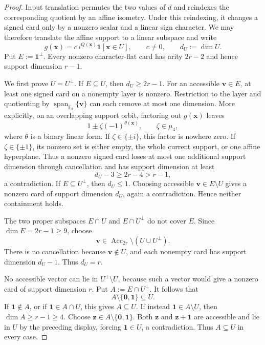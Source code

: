 \documentclass[11pt,letterpaper,onecolumn]{article}
\theoremstyle{plain}
\theoremstyle{definition}
\theoremstyle{remark}
\newcommand{\Ftwo}{\mathbb F_2}
\newcommand{\Span}{\operatorname{span}}
\newcommand{\one}{\mathbf 1}
\newcommand{\zero}{\mathbf 0}
\begin{document}
\begin{proof}
Input translation permutes the two values of \(d\) and reindexes the
corresponding quotient by an affine isometry.  Under this reindexing, it
changes a signed card only by a nonzero scalar and a linear sign character.
We may therefore
translate the affine support to a linear subspace and write
\hypertarget{eq:v4-recognition-normal-form}{}
\begin{equation*}
 g({\mathbf{x}})=c\,i^{Q({\mathbf{x}})}\one[{\mathbf{x}}\in U],
 \qquad c\ne0,
 \qquad d_U:=\dim U.
\end{equation*}
Put \(E:=\one^\perp\).  Every nonzero character-flat card has arity
\(2r-2\) and hence support dimension \(r-1\).

We first prove \(U=U^\perp\).  If \(E\subseteq U\), then
\(d_U\ge2r-1\).  For an accessible \({\mathbf{v}}\in E\), at least one signed card on
a nonempty layer is nonzero.  Restriction to the layer and quotienting by
\(\Span_{\Ftwo}\{{\mathbf{v}}\}\) can each remove at most one dimension.  More
explicitly, on an overlapping support orbit, factoring out \(g({\mathbf{x}})\) leaves
\[
 1\pm\zeta(-1)^{\theta({\mathbf{x}})},
 \qquad \zeta\in\mu_4,
\]
where \(\theta\) is a binary linear form.  If
\(\zeta\in\{\pm i\}\), this factor is nowhere zero.  If
\(\zeta\in\{\pm1\}\), its nonzero set is either empty, the whole current
support, or one affine hyperplane.  Thus a nonzero signed card loses at
most one additional support dimension through cancellation and has support
dimension at least
\[
 d_U-3\ge2r-4>r-1,
\]
a contradiction.  If \(E\subseteq U^\perp\), then \(d_U\le1\). Choosing
accessible \({\mathbf{v}}\in E\setminus U\) gives a nonzero card of support dimension
\(d_U\), again a contradiction.  Hence neither containment holds.

The two proper subspaces \(E\cap U\) and \(E\cap U^\perp\) do not cover
\(E\).  Since \(\dim E=2r-1\ge9\), choose
\[
 {\mathbf{v}}\in\operatorname{Acc}_{2r}\setminus(U\cup U^\perp).
\]
There is no cancellation because \({\mathbf{v}}\notin U\), and each nonempty card has
support dimension \(d_U-1\).  Thus \(d_U=r\).

No accessible vector can lie in \(U^\perp\setminus U\), because such a
vector would give a nonzero card of support dimension \(r\).  Put
\(A:=E\cap U^\perp\).  It follows that
\hypertarget{eq:v4-A-contained}{}
\begin{equation*}
 A\setminus\{\zero,\one\}\subseteq U.
\end{equation*}
If \(\one\notin A\), or if \(\one\in A\cap U\), this gives
\(A\subseteq U\).  If instead \(\one\in A\setminus U\), then
\(\dim A\ge r-1\ge4\). Choose \({\mathbf{z}}\in A\setminus\{\zero,\one\}\).  Both
\({\mathbf{z}}\) and \({\mathbf{z}}+\one\) are accessible and lie in \(U\) by the preceding
display, forcing \(\one\in U\), a contradiction.  Thus \(A\subseteq U\)
in every case.


\end{proof}
\end{document}
